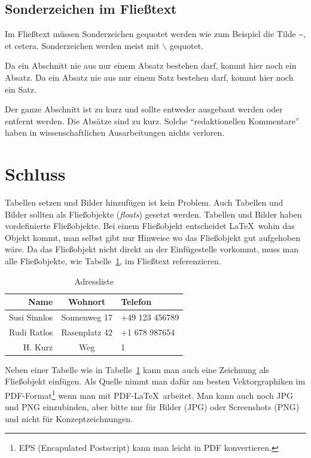 \documentclass[11pt,a4paper]{article} %
\begin{document}
\subsection{Sonderzeichen im Fließtext}

Im Fließtext müssen Sonderzeichen gequotet werden wie 
zum Beispiel die Tilde \~{}, et cetera.
Sonderzeichen werden meist mit $\backslash$ gequotet.

Da ein Abschnitt nie aus nur einem Absatz bestehen darf,
kommt hier noch ein Absatz.
Da ein Absatz nie aus nur einem Satz bestehen darf,
kommt hier noch ein Satz.

Der ganze Abschnitt ist zu kurz und sollte entweder ausgebaut
werden oder entfernt werden.
Die Absätze sind zu kurz.
Solche "`redaktionellen Kommentare"' haben in wissenschaftlichen
Ausarbeitungen nichts verloren.


\section{Schluss} \label{sec:schluss}

Tabellen setzen und Bilder hinzufügen ist kein Problem. 
Auch Tabellen und Bilder sollten als Fließobjekte (\emph{floats})
gesetzt werden.
Tabellen und Bilder haben vordefinierte Fließobjekte.
Bei einem Fließobjekt entscheidet \LaTeX\ wohin das Objekt kommt,
man selbst gibt nur Hinweise wo das Fließobjekt gut aufgehoben wäre.
Da das Fließobjekt nicht direkt an der Einfügestelle vorkommt,
muss man alle Fließobjekte, wie Tabelle~\ref{tab:meinetab}, im
Fließtext referenzieren.

\begin{table}[htbp] %
\centering
\begin{tabular}{|r|c|l|}
\hline
\textbf{Name} & \textbf{Wohnort} & \textbf{Telefon} \\ 
\hline\hline
Susi Sinnlos & Sonnenweg 17 & +49 123 456789 \\\hline
Rudi Ratlos & Rasenplatz 42 & +1 678 987654 \\\hline
H. Kurz & Weg & 1 \\\hline
\end{tabular}
\caption{Adressliste}
\label{tab:meinetab}
\end{table}

Neben einer Tabelle wie in Tabelle~\ref{tab:meinetab} kann man 
auch eine Zeichnung als Fließobjekt einfügen.
Als Quelle nimmt man dafür am besten Vektorgraphiken im
PDF-Format\footnote{EPS (Encapulated Postscript\cite{postscript})
  kann man leicht in PDF konvertieren.}
wenn man mit PDF-\LaTeX\ arbeitet.
Man kann auch noch JPG und PNG einzubinden, aber bitte nur
für Bilder (JPG) oder Screenshots (PNG) und nicht für Konzeptzeichnungen.
\end{document}

